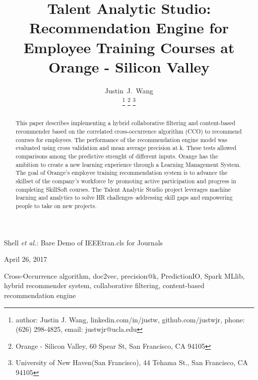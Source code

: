 \documentclass[12pt,journal]{IEEEtran}
\begin{document}
%

\title{Talent Analytic Studio: Recommendation Engine for Employee Training Courses at Orange - Silicon Valley}

\author{Justin~J.~Wang \footnotemark[*]

\thanks{author: Justin J. Wang, linkedin.com/in/justw, github.com/justwjr, phone: (626) 298-4825, email: justwjr@ucla.edu}%
\thanks{Orange - Silicon Valley, 60 Spear St, San Francisco, CA 94105}%
\thanks{University of New Haven(San Francisco), 44 Tehama St., San Francisco, CA 94105}}

%
{Shell \MakeLowercase{\textit{et al.}}: Bare Demo of IEEEtran.cls for Journals}

\maketitle

\begin{center}
     April 26, 2017
\end{center}

\begin{abstract}
This paper describes implementing a hybrid collaborative filtering and content-based recommender based on the correlated cross-occurrence algorithm (CCO) to recommend courses for employees.  The performance of the recommendation engine model was evaluated using cross validation and mean average precision at k.  These tests allowed comparisons among the predictive strenght of different inputs.  Orange has the ambition to create a new learning experience through a Learning Management System.  The goal of Orange's employee training recommendation system is to advance the skillset of the company's workforce by promoting active participation and progress in completing SkillSoft courses.  The Talent Analytic Studio project leverages machine learning and analytics to solve HR challenges--addressing skill gaps and empowering people to take on new projects.
\end{abstract}

\begin{IEEEkeywords}
Cross-Occurrence algorithm, doc2vec, precision@k, PredictionIO, Spark MLlib, hybrid recommender system, collaborative filtering, content-based recommendation engine\end{IEEEkeywords}
\end{document}
